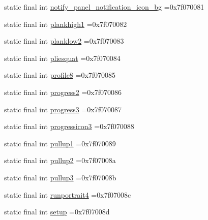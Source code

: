 \begin{DoxyCompactItemize}
\item 
static final int \mbox{\hyperlink{classcom_1_1example_1_1trainawearapplication_1_1_r_1_1drawable_acde75c230a095ed9b45099aae3916944}{notify\+\_\+panel\+\_\+notification\+\_\+icon\+\_\+bg}} =0x7f070081
\item 
static final int \mbox{\hyperlink{classcom_1_1example_1_1trainawearapplication_1_1_r_1_1drawable_a37dc3232a4075940daf3c0fc0dc5579a}{plankhigh1}} =0x7f070082
\item 
static final int \mbox{\hyperlink{classcom_1_1example_1_1trainawearapplication_1_1_r_1_1drawable_a6d445948ed0cf568a450dddb7e5443f4}{planklow2}} =0x7f070083
\item 
static final int \mbox{\hyperlink{classcom_1_1example_1_1trainawearapplication_1_1_r_1_1drawable_af0e07607807c44d92fe292df40a31e2c}{pliesquat}} =0x7f070084
\item 
static final int \mbox{\hyperlink{classcom_1_1example_1_1trainawearapplication_1_1_r_1_1drawable_abba34824f47178b5ff3e3f460047c82e}{profile8}} =0x7f070085
\item 
static final int \mbox{\hyperlink{classcom_1_1example_1_1trainawearapplication_1_1_r_1_1drawable_a2753b28372b28899171fb374d4bc92d7}{progress2}} =0x7f070086
\item 
static final int \mbox{\hyperlink{classcom_1_1example_1_1trainawearapplication_1_1_r_1_1drawable_a2287f468d3245229672eaa56653bb83a}{progress3}} =0x7f070087
\item 
static final int \mbox{\hyperlink{classcom_1_1example_1_1trainawearapplication_1_1_r_1_1drawable_ae7c272be68be11611f0cbb2f85b3b74e}{progressicon3}} =0x7f070088
\item 
static final int \mbox{\hyperlink{classcom_1_1example_1_1trainawearapplication_1_1_r_1_1drawable_a853053c3e22294085cc95a16bb00c847}{pullup1}} =0x7f070089
\item 
static final int \mbox{\hyperlink{classcom_1_1example_1_1trainawearapplication_1_1_r_1_1drawable_a2c60afd17229d8a1990a00d6872f2805}{pullup2}} =0x7f07008a
\item 
static final int \mbox{\hyperlink{classcom_1_1example_1_1trainawearapplication_1_1_r_1_1drawable_ae8e1fa4b48e3c6f41cba0279a183a639}{pullup3}} =0x7f07008b
\item 
static final int \mbox{\hyperlink{classcom_1_1example_1_1trainawearapplication_1_1_r_1_1drawable_afd73b15c373a4142fea7c3a7d1f16710}{runportrait4}} =0x7f07008c
\item 
static final int \mbox{\hyperlink{classcom_1_1example_1_1trainawearapplication_1_1_r_1_1drawable_a4c7fdb04aa87ffaac3f6dfbc2dcd83ba}{setup}} =0x7f07008d

\end{DoxyCompactItemize}
